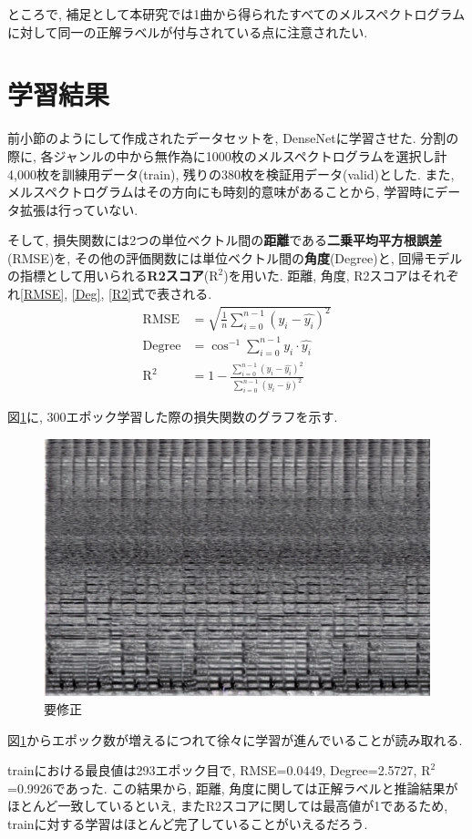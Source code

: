 \documentclass[a4paper,11pt,dvipdfmx]{jreport}
\begin{document}
ところで, 補足として本研究では1曲から得られたすべてのメルスペクトログラムに対して同一の正解ラベルが付与されている点に注意されたい.

\section{学習結果}
\label{learning}
前小節のようにして作成されたデータセットを, DenseNetに学習させた.
分割の際に, 各ジャンルの中から無作為に1000枚のメルスペクトログラムを選択し計4,000枚を訓練用データ(train), 残りの380枚を検証用データ(valid)とした.
また, メルスペクトログラムはその方向にも時刻的意味があることから, 学習時にデータ拡張は行っていない.

\newpage
そして, 損失関数には2つの単位ベクトル間の\textbf{距離}である\textbf{二乗平均平方根誤差}(RMSE)を, その他の評価関数には単位ベクトル間の\textbf{角度}(Degree)と, 回帰モデルの指標として用いられる\textbf{R2スコア}($\mathrm{R^2}$)を用いた.
距離, 角度, R2スコアはそれぞれ\ref{RMSE}, \ref{Deg}, \ref{R2}式で表される.
\begin{align}
  \mathrm{RMSE}&= \sqrt{\frac{1}{n} \sum_{i=0}^{n-1} (y_i - \hat{y_i})^2}\label{RMSE} \\ 
  \mathrm{Degree} &= \cos^{-1}{\sum_{i=0}^{n-1}y_i \cdot \hat{y_i}}\label{Deg}\\
  \mathrm{R^2} &= 1 - \frac{\displaystyle \sum_{i=0}^{n-1}(y_i - \hat{y_i})^2}{\displaystyle \sum_{i=0}^{n-1}(y_i - \bar{y})^2}\label{R2}
\end{align}

図\ref{result}に, 300エポック学習した際の損失関数のグラフを示す.

\begin{figure}[htbp]
  \centering
  \includegraphics[width=0.4\linewidth]{energy_guitar.jpg}
  \caption{要修正}
  \label{result}
\end{figure}

図\ref{result}からエポック数が増えるにつれて徐々に学習が進んでいることが読み取れる.

trainにおける最良値は293エポック目で, RMSE=0.0449, Degree=2.5727, $\mathrm{R^2}$=0.9926であった. この結果から, 距離, 角度に関しては正解ラベルと推論結果がほとんど一致しているといえ, またR2スコアに関しては最高値が1であるため, trainに対する学習はほとんど完了していることがいえるだろう.
\end{document}
